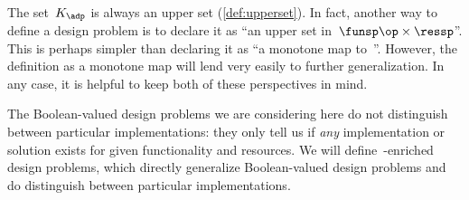 \begin{remark}
    \label{rem:feasible-set-is-upper}
    The set~$K_\adp$ is always an upper set (\cref{def:upperset}).
    In fact, another way to define a design problem is to declare it as ``an upper set in~$\funsp\op \times \ressp$''. This is perhaps simpler than declaring it as ``a monotone map to~\Bool''. However, the definition as a monotone map will lend very easily to further generalization. In any case, it is helpful to keep both of these perspectives in mind.
\end{remark}



The Boolean-valued design problems we are considering here do not distinguish between particular implementations:
they only tell us if \emph{any} implementation or solution exists for given functionality and resources.
We will define~\Set-enriched design problems, which directly generalize Boolean-valued design problems and do distinguish between particular implementations.

